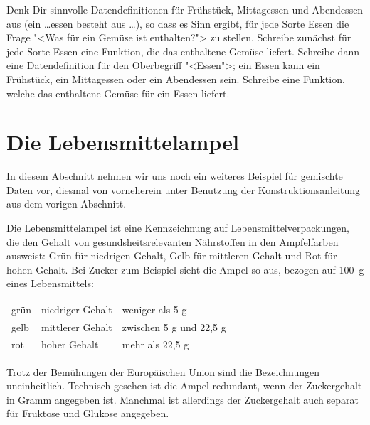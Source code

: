 \begin{aufgabe}
  Denk Dir sinnvolle Datendefinitionen für Frühstück, Mittagessen und
  Abendessen aus (ein \ldots{}essen besteht aus \ldots), so dass es
  Sinn ergibt, für jede Sorte Essen die Frage "<Was für ein Gemüse ist
  enthalten?"> zu stellen.  Schreibe zunächst für jede Sorte Essen
  eine Funktion, die das enthaltene Gemüse liefert.  Schreibe dann
  eine Datendefinition für den Oberbegriff "<Essen">; ein Essen kann
  ein Frühstück, ein Mittagessen oder ein Abendessen sein.  Schreibe
  eine Funktion, welche das enthaltene Gemüse für ein Essen liefert.
\end{aufgabe}

\section{Die Lebensmittelampel}

In diesem Abschnitt nehmen wir uns noch ein weiteres Beispiel für
gemischte Daten vor, diesmal von vorneherein unter Benutzung der
Konstruktionsanleitung aus dem vorigen Abschnitt.

Die Lebensmittelampel ist eine Kennzeichnung auf Lebensmittelverpackungen,
die den Gehalt von gesundsheitsrelevanten Nährstoffen in den
Ampfelfarben ausweist: Grün für niedrigen Gehalt, Gelb für mittleren Gehalt und
Rot für hohen Gehalt. Bei Zucker zum Beispiel sieht die Ampel so aus, bezogen
auf 100~g eines Lebensmittels:
%
\begin{center}
  \begin{tabular}{l|l|l}
    grün & niedriger Gehalt &  weniger als 5 g\\
    gelb & mittlerer Gehalt & zwischen 5 g und 22,5 g\\
    rot & hoher Gehalt & mehr als 22,5 g
  \end{tabular}
\end{center}
%
Trotz der Bemühungen der Europäischen Union sind die
Bezeichnungen uneinheitlich.  Technisch gesehen ist die Ampel
redundant, wenn der Zuckergehalt in Gramm angegeben ist.
Manchmal ist allerdings der Zuckergehalt auch separat für Fruktose und
Glukose angegeben.

